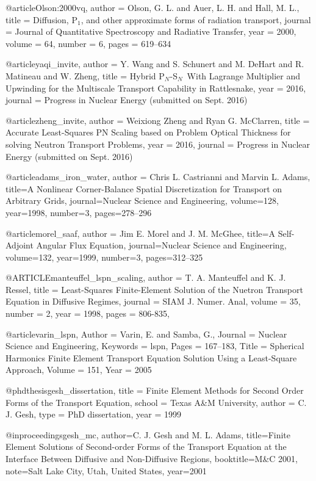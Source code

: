 @article{Olson:2000vq,
author = {Olson, G. L. and Auer, L. H. and Hall, M. L.},
title = {{Diffusion, P$_1$, and other approximate forms of radiation transport}},
journal = {Journal of Quantitative Spectroscopy and Radiative Transfer},
year = {2000},
volume = {64},
number = {6},
pages = {619--634}
}

@article{yaqi_invite,
	author = {Y. Wang and S. Schunert and M. DeHart and R. Matineau and W. Zheng},
	title = {{Hybrid P$_N$-S$_N$\ With Lagrange Multiplier and Upwinding for the Multiscale Transport Capability in Rattlesnake}},
	year = {2016},
	journal = {Progress in Nuclear Energy (submitted on Sept. 2016)}
}

@article{zheng_invite,
	author = {Weixiong Zheng and Ryan G. McClarren},
	title = {{Accurate Least-Squares PN Scaling based on Problem Optical Thickness for solving Neutron Transport Problems}},
	year = {2016},
	journal = {Progress in Nuclear Energy (submitted on Sept. 2016)}
}

@article{adams_iron_water,
author = {Chris L. Castrianni and Marvin L. Adams},
title={{A Nonlinear Corner-Balance Spatial Discretization for Transport on Arbitrary Grids}},
journal={Nuclear Science and Engineering},
volume={128},
year={1998},
number={3},
pages={278--296}
}

@article{morel_saaf,
	author = {Jim E. Morel and J. M. McGhee},
	title={{A Self-Adjoint Angular Flux Equation}},
	journal={Nuclear Science and Engineering},
	volume={132},
	year={1999},
	number={3},
	pages={312--325}
}

@ARTICLE{manteuffel_lspn_scaling,
	author = {T. A. Manteuffel and K. J. Ressel},
	title = {{Least-Squares Finite-Element Solution of the Nuetron Transport Equation in Diffusive Regimes}},
	journal = {SIAM J. Numer. Anal},
	volume = {35},
	number = {2},
	year = {1998},
	pages = {806-835},
}

@article{varin_lspn,
	Author = {Varin, E. and Samba, G.},
	Journal = {Nuclear Science and Engineering},
	Keywords = {lspn},
	Pages = {167--183},
	Title = {{Spherical Harmonics Finite Element Transport Equation Solution Using a Least-Square Approach}},
	Volume = {151},
	Year = {2005}}

@phdthesis{gesh_dissertation,
	title    = {Finite Element Methods for Second Order Forms of the Transport Equation},
	school   = {Texas A\&M University},
	author   = {C. J. Gesh},
	type     = {{PhD} dissertation},
	year     = {1999}
}

@inproceedings{gesh_mc,
	author={C. J. Gesh and M. L. Adams},
	title={{Finite Element Solutions of Second-order Forms of the Transport Equation at the Interface Between Diffusive and Non-Diffusive Regions}},
	booktitle={M\&C 2001},
	note={Salt Lake City, Utah, United States},
	year={2001}
}

